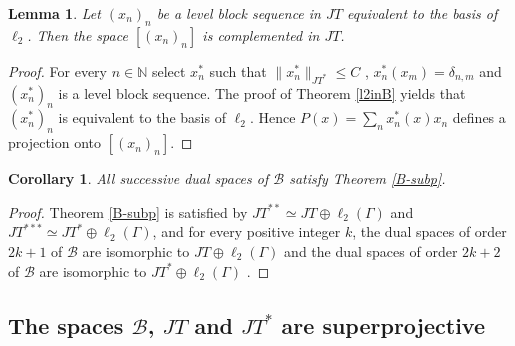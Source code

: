 \documentclass[12pt]{amsart}
\theoremstyle{plain}
\numberwithin{equation}{section}
\newcommand{\N}{\mathbb{N}}
\newcommand{\B}{\mathcal{B}}
\newtheorem{lemma}[theorem]{Lemma}
\newtheorem{corollary}[theorem]{Corollary}
\begin{document}
\begin{lemma}\label{compl.JT} Let $(x_n)_n$ be a level block sequence in $JT$ equivalent to the basis of $\ell_2$. Then the space $[(x_n)_n]$ is complemented in $JT$.
\end{lemma}
\begin{proof} For every $n\in \N$ select $x_n^*$ such that $\|x_n^*\|_{JT^*} \le C$ , $x_n^*(x_m )= \delta _{n,m} $ and $(x_n^*) _n$ is a level block sequence. The proof of Theorem \ref{l2inB} yields that   $(x_n^*) _n$  is equivalent to the basis of $\ell_2$. Hence $P(x) = \sum_{n}x_n^*(x)x_n$ defines a projection onto $[(x_n)_n]$.
\end{proof}

\begin{corollary}\label{higher-d}
All successive dual spaces of $\B$ satisfy Theorem \ref{B-subp}.
\end{corollary}
\begin{proof}
Theorem \ref{B-subp} is satisfied by $JT^{**}\simeq JT\oplus \ell_2(\Gamma)$ and $JT^{***}\simeq JT^*\oplus \ell_2(\Gamma)$, and for every positive integer $k$, the dual spaces of order $2k+1$ of $\B$ are isomorphic to $JT\oplus \ell_2(\Gamma)$ and the dual spaces of order $2k+2$ of $\B$ are isomorphic to $JT^*\oplus \ell_2(\Gamma)$ \cite[Corollary 3.c.7]{FetterG}.
\end{proof}

\subsection{The spaces $\B$, $JT$ and $JT^*$ are superprojective}\label{sect:superp}
\end{document}

